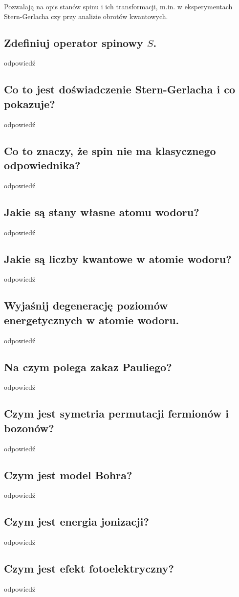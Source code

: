 Pozwalają na opis stanów spinu i ich transformacji, m.in. w eksperymentach Stern-Gerlacha czy przy analizie obrotów kwantowych.

\subsection{Zdefiniuj operator spinowy $S$.}

odpowiedź

\subsection{Co to jest doświadczenie Stern-Gerlacha i co pokazuje?}

odpowiedź

\subsection{Co to znaczy, że spin nie ma klasycznego odpowiednika?}

odpowiedź

\subsection{Jakie są stany własne atomu wodoru?}

odpowiedź

\subsection{Jakie są liczby kwantowe w atomie wodoru?}

odpowiedź

\subsection{Wyjaśnij degenerację poziomów energetycznych w atomie wodoru.}

odpowiedź

\subsection{Na czym polega zakaz Pauliego?}

odpowiedź

\subsection{Czym jest symetria permutacji fermionów i bozonów?}

odpowiedź

\subsection{Czym jest model Bohra?}

odpowiedź

\subsection{Czym jest energia jonizacji?}

odpowiedź

\subsection{Czym jest efekt fotoelektryczny?}

odpowiedź
